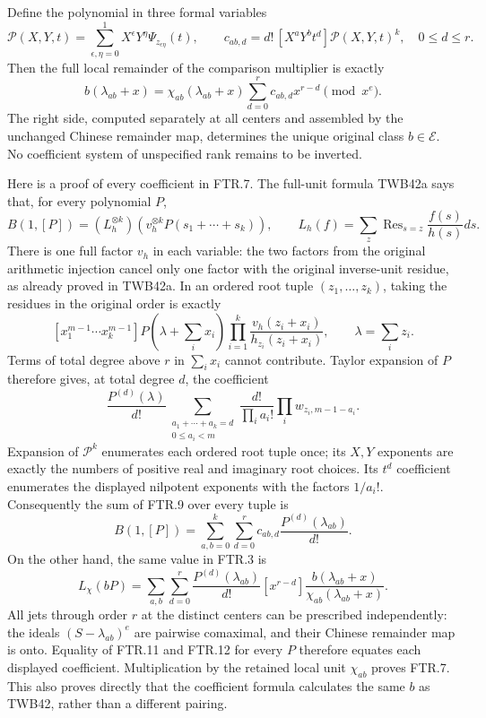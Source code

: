 Define the polynomial in three formal variables
\[
 \mathcal P(X,Y,t)=\sum_{\epsilon,\eta=0}^1
                         X^\epsilon Y^\eta\Psi_{z_{\epsilon\eta}}(t),
 \qquad
 c_{ab,d}=d!\,[X^aY^bt^d]\mathcal P(X,Y,t)^k,
 \quad 0\leq d\leq r.
 \tag{FTR.6}
\]
Then the full local remainder of the comparison multiplier is exactly
\[
 \boxed{\quad
 b(\lambda_{ab}+x)
   =\chi_{ab}(\lambda_{ab}+x)
                  \sum_{d=0}^{r}c_{ab,d}x^{r-d}\pmod{x^e}.
 \quad}\tag{FTR.7}
\]
The right side, computed separately at all centers and assembled by
the unchanged Chinese remainder map, determines the unique original
class $b\in\mathcal E$. No coefficient system of unspecified rank
remains to be inverted.

Here is a proof of every coefficient in FTR.7. The full-unit formula
TWB42a says that, for every polynomial $P$,
\[
 B(1,[P])=(L_h^{\otimes k})
       \left(v_h^{\otimes k}P(s_1+\cdots+s_k)\right),
 \qquad L_h(f)=\sum_z\operatorname{Res}_{s=z}\frac{f(s)}{h(s)}ds.
 \tag{FTR.8}
\]
There is one full factor $v_h$ in each variable: the two factors
from the original arithmetic injection cancel only one factor with
the original inverse-unit residue, as already proved in TWB42a.
In an ordered root tuple $(z_1,\ldots,z_k)$, taking the residues in
the original order is exactly
\[
 [x_1^{m-1}\cdots x_k^{m-1}]
       P\left(\lambda+\sum_i x_i\right)
       \prod_{i=1}^k\frac{v_h(z_i+x_i)}{h_{z_i}(z_i+x_i)},
 \qquad \lambda=\sum_i z_i.
 \tag{FTR.9}
\]
Terms of total degree above $r$ in $\sum_i x_i$ cannot contribute.
Taylor expansion of $P$ therefore gives, at total degree $d$, the
coefficient
\[
 \frac{P^{(d)}(\lambda)}{d!}
 \sum_{\substack{a_1+\cdots+a_k=d\\0\leq a_i<m}}
        \frac{d!}{\prod_i a_i!}\prod_i w_{z_i,m-1-a_i}.
 \tag{FTR.10}
\]
Expansion of $\mathcal P^k$ enumerates each ordered root tuple once;
its $X,Y$ exponents are exactly the numbers of positive real and
imaginary root choices. Its $t^d$ coefficient enumerates the displayed
nilpotent exponents with the factors $1/a_i!$. Consequently the sum
of FTR.9 over every tuple is
\[
 B(1,[P])=\sum_{a,b=0}^k\sum_{d=0}^r
                   c_{ab,d}\frac{P^{(d)}(\lambda_{ab})}{d!}.
 \tag{FTR.11}
\]
On the other hand, the same value in FTR.3 is
\[
 L_\chi(bP)=\sum_{a,b}\sum_{d=0}^r
  \frac{P^{(d)}(\lambda_{ab})}{d!}
  [x^{r-d}]\frac{b(\lambda_{ab}+x)}{\chi_{ab}(\lambda_{ab}+x)}.
 \tag{FTR.12}
\]
All jets through order $r$ at the distinct centers can be prescribed
independently: the ideals $(S-\lambda_{ab})^e$ are pairwise comaximal,
and their Chinese remainder map is onto. Equality of FTR.11 and
FTR.12 for every $P$ therefore equates each displayed coefficient.
Multiplication by the retained local unit $\chi_{ab}$ proves FTR.7.
This also proves directly that the coefficient formula calculates
the same $b$ as TWB42, rather than a different pairing.

